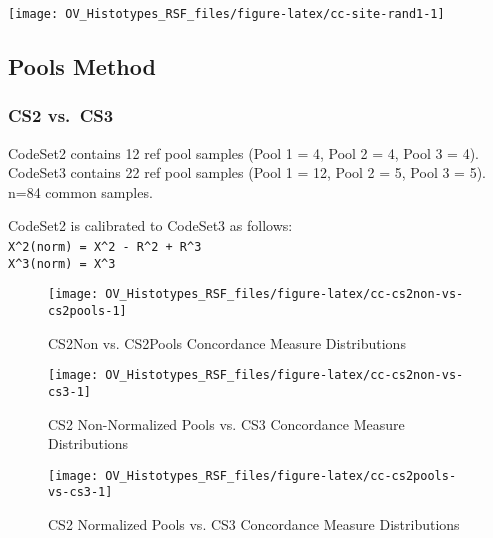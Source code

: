 \documentclass[
]{report}
\begin{document}
\begin{center}\texttt{[image: OV\_Histotypes\_RSF\_files/figure-latex/cc-site-rand1-1]} \end{center}

\hypertarget{pools-method-1}{%
\subsection{Pools Method}\label{pools-method-1}}

\hypertarget{cs2-vs.-cs3}{%
\subsubsection{CS2 vs.~CS3}\label{cs2-vs.-cs3}}

CodeSet2 contains 12 ref pool samples (Pool 1 = 4, Pool 2 = 4, Pool 3 = 4). CodeSet3 contains 22 ref pool samples (Pool 1 = 12, Pool 2 = 5, Pool 3 = 5). n=84 common samples.

CodeSet2 is calibrated to CodeSet3 as follows:\\
\texttt{X\^{}2(norm)\ =\ X\^{}2\ -\ R\^{}2\ +\ R\^{}3}~\\
\texttt{X\^{}3(norm)\ =\ X\^{}3}

\begin{figure}[H]

{\centering \texttt{[image: OV\_Histotypes\_RSF\_files/figure-latex/cc-cs2non-vs-cs2pools-1]} 

}

\caption{CS2Non vs. CS2Pools Concordance Measure Distributions}\label{fig:cc-cs2non-vs-cs2pools}
\end{figure}

\begin{figure}[H]

{\centering \texttt{[image: OV\_Histotypes\_RSF\_files/figure-latex/cc-cs2non-vs-cs3-1]} 

}

\caption{CS2 Non-Normalized Pools vs. CS3 Concordance Measure Distributions}\label{fig:cc-cs2non-vs-cs3}
\end{figure}

\begin{figure}[H]

{\centering \texttt{[image: OV\_Histotypes\_RSF\_files/figure-latex/cc-cs2pools-vs-cs3-1]} 

}

\caption{CS2 Normalized Pools vs. CS3 Concordance Measure Distributions}\label{fig:cc-cs2pools-vs-cs3}
\end{figure}
\end{document}
